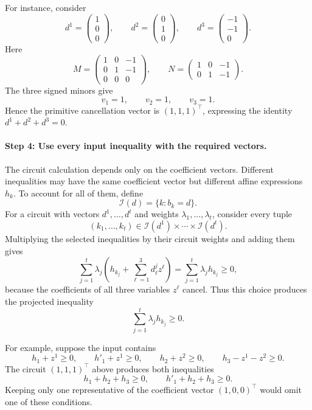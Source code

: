 \documentclass[a4paper,11pt]{amsart}
\numberwithin{equation}{section}
\theoremstyle{definition}
\theoremstyle{remark}
\begin{document}
For instance, consider
\[
 d^1=
 \begin{pmatrix}1\\0\\0\end{pmatrix},
 \qquad
 d^2=
 \begin{pmatrix}0\\1\\0\end{pmatrix},
 \qquad
 d^3=
 \begin{pmatrix}-1\\-1\\0\end{pmatrix}.
\]
Here
\[
 M=
 \begin{pmatrix}
 1&0&-1\\
 0&1&-1\\
 0&0&0
 \end{pmatrix},
 \qquad
 N=
 \begin{pmatrix}
 1&0&-1\\
 0&1&-1
 \end{pmatrix}.
\]
The three signed minors give
\[
 v_1=1,\qquad v_2=1,\qquad v_3=1.
\]
Hence the primitive cancellation vector is $(1,1,1)^\top$, expressing
the identity $d^1+d^2+d^3=0$.

\paragraph{Step 4: Use every input inequality with the required vectors.}
The circuit calculation depends only on the coefficient vectors.
Different inequalities may have the same coefficient vector but
different affine expressions $h_k$. To account for all of them, define
\[
 \mathcal I(d)=\{k:b_k=d\}.
\]
For a circuit with vectors $d^1,\ldots,d^t$ and weights
$\lambda_1,\ldots,\lambda_t$, consider every tuple
\[
 (k_1,\ldots,k_t)
 \in
 \mathcal I(d^1)\times\cdots\times\mathcal I(d^t).
\]
Multiplying the selected inequalities by their circuit weights and
adding them gives
\[
 \sum_{j=1}^t\lambda_j
 \left(h_{k_j}+\sum_{\ell=1}^3d^j_\ell z^\ell\right)
 =
 \sum_{j=1}^t\lambda_jh_{k_j}\ge0,
\]
because the coefficients of all three variables $z^\ell$ cancel.
Thus this choice produces the projected inequality
\[
 \sum_{j=1}^t\lambda_jh_{k_j}\ge0.
\]

For example, suppose the input contains
\[
 h_1+z^1\ge0,\qquad
 h'_1+z^1\ge0,\qquad
 h_2+z^2\ge0,\qquad
 h_3-z^1-z^2\ge0.
\]
The circuit $(1,1,1)^\top$ above produces both inequalities
\[
 h_1+h_2+h_3\ge0,
 \qquad
 h'_1+h_2+h_3\ge0.
\]
Keeping only one representative of the coefficient vector
$(1,0,0)^\top$ would omit one of these conditions.
\end{document}
